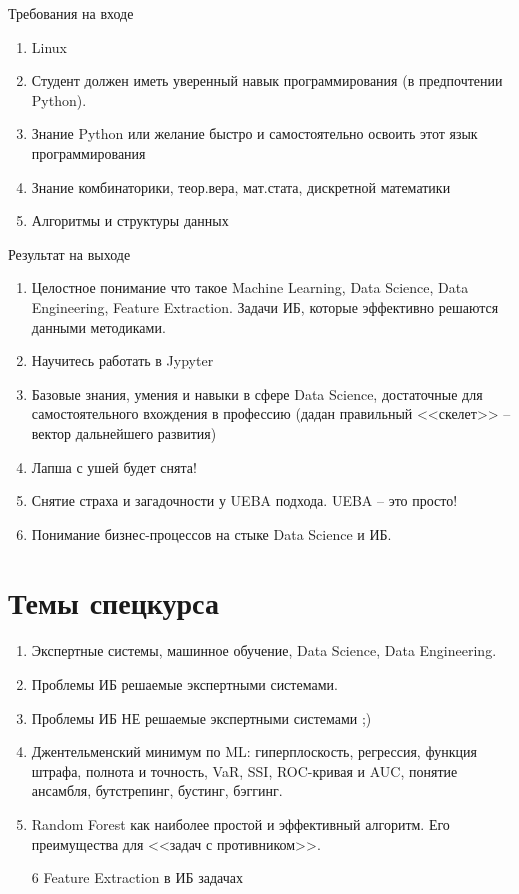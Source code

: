 \documentclass{beamer}
\newcommand{\рис}[1]{рис.\ref{#1}}
\newcommand{\Рис}[1]{Рис.\ref{#1}}
\newcommand{\таблицa}[1]{таблица~№\ref{#1}} %
\newcommand{\таблицы}[1]{таблицы~№\ref{#1}} %
\newcommand{\таблице}[1]{таблице~№\ref{#1}} %
\newcommand{\таблицу}[1]{таблицу~№\ref{#1}} %
\newcommand{\таблицей}[1]{таблицей~№\ref{#1}} %
\newcommand{\Таблицa}[1]{Таблица~№\ref{#1}} %
\newcommand{\Таблицы}[1]{Таблицы~№\ref{#1}} %
\newcommand{\Таблице}[1]{Таблице~№\ref{#1}} %
\newcommand{\Таблицу}[1]{Таблицу~№\ref{#1}} %
\newcommand{\Таблицей}[1]{Таблицей~№\ref{#1}} %
\begin{document}
  \begin{frame}{Требования на входе}
  \begin{enumerate}
  	\item Linux
  	\item Студент должен иметь уверенный навык программирования
  	(в предпочтении Python).
  	\item Знание Python или желание быстро и самостоятельно освоить этот 
  	язык программирования
  	\item Знание комбинаторики, теор.вера, мат.стата, дискретной математики
  	\item Алгоритмы и структуры данных
  \end{enumerate}
  \end{frame}

   \begin{frame}{Результат на выходе}
   \begin{enumerate}
     \item Целостное понимание что такое 
     Machine Learning, 
     Data Science, 
     Data Engineering, 
     Feature Extraction.
     Задачи ИБ, которые эффективно решаются данными методиками.
     \item Научитесь работать в Jypyter
     \item Базовые знания, умения и навыки 
     в сфере Data Science,
     достаточные для самостоятельного вхождения в профессию
     (дадан правильный <<скелет>> -- вектор дальнейшего развития)
     \item Лапша с ушей будет снята!
     \item Снятие страха и загадочности у UEBA подхода. 
     UEBA -- это просто!
     \item Понимание бизнес-процессов на стыке
     Data Science и ИБ.
   \end{enumerate}
   \end{frame}

  \section{Темы спецкурса}\label{section:topics}
  
  \begin{frame}
	\begin{enumerate}
	\item Экспертные системы, машинное обучение, Data Science, Data Engineering.
	\item Проблемы ИБ решаемые экспертными системами.
	\item Проблемы ИБ НЕ решаемые экспертными системами ;)
	\item Джентельменский минимум по ML: гиперплоскость, регрессия, функция штрафа, полнота и точность, VaR, SSI, ROC-кривая и AUC, понятие ансамбля, бутстрепинг, бустинг, бэггинг.
	\item Random Forest как наиболее простой и эффективный алгоритм. Его преимущества для 
	<<задач с противником>>.
	\item[6] Feature Extraction в ИБ задачах
	\end{enumerate}
\end{frame}
\end{document}
